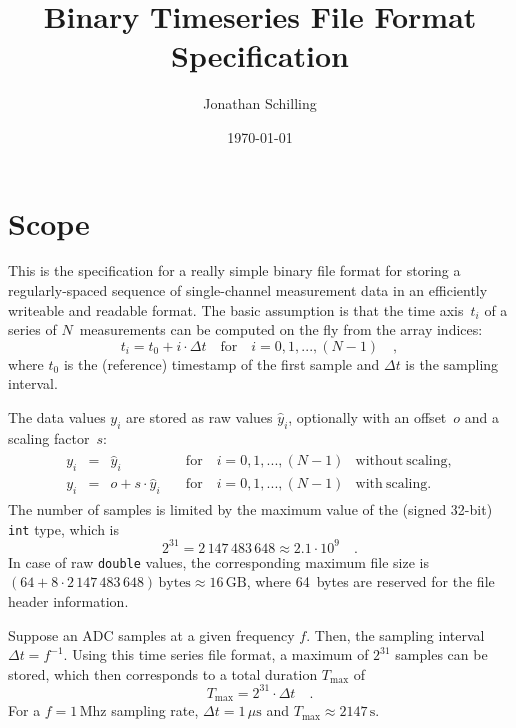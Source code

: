 \documentclass[a4paper,10pt]{article}
\title{Binary Timeseries File Format Specification}
\author{Jonathan Schilling}
\date{\today}
\begin{document}
\maketitle

\section{Scope}\label{sec:scope}

This is the specification for a really simple binary file format for storing a regularly-spaced sequence of single-channel measurement data
in an efficiently writeable and readable format.
The basic assumption is that the time axis~$t_i$ of a series of $N$~measurements can be computed on the fly from the array indices:
\begin{equation}
  t_i = t_0 + i \cdot \Delta t \quad \mathrm{for} \quad i = 0, 1, ..., (N-1) \quad ,
\end{equation}
where $t_0$ is the (reference) timestamp of the first sample and $\Delta t$ is the sampling interval.

The data values $y_i$ are stored as raw values $\hat{y}_i$, optionally with an offset~$o$ and a scaling factor~$s$:
\begin{gather}
\begin{aligned}
  y_i & = &             \hat{y}_i & \quad \mathrm{for} \quad i = 0, 1, ..., (N-1) & \mathrm{without~scaling,} \\
  y_i & = & o + s \cdot \hat{y}_i & \quad \mathrm{for} \quad i = 0, 1, ..., (N-1) & \mathrm{with~scaling.}
\end{aligned}
\end{gather}
The number of samples is limited by the maximum value of the (signed 32-bit) \texttt{int} type, which is
\begin{equation}
  2^{31} = 2\,147\,483\,648 \approx 2.1 \cdot 10^9 \quad .
\end{equation}
In case of raw \texttt{double} values, the corresponding maximum file size is $(64 + 8 \cdot 2\,147\,483\,648)\,\mathrm{bytes} \approx 16\,\mathrm{GB}$,
where 64~bytes are reserved for the file header information.

Suppose an ADC samples at a given frequency $f$. Then, the sampling interval $\Delta t = f^{-1}$.
Using this time series file format, a maximum of $2^{31}$ samples can be stored, which then corresponds to a
total duration $T_\mathrm{max}$ of
\begin{equation}
  T_\mathrm{max} = 2^{31} \cdot \Delta t \quad .
\end{equation}
For a $f = 1\,\mathrm{Mhz}$ sampling rate, $\Delta t = 1\,\mu\mathrm{s}$ and $T_\mathrm{max} \approx 2147\,\mathrm{s}$.
\end{document}
